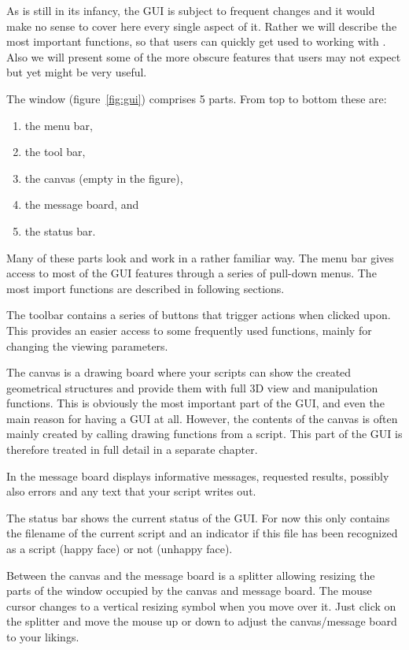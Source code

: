 As \pyf is still in its infancy, the GUI is subject to frequent changes and it would make no sense to cover here every single aspect of it. Rather we will describe the most important functions, so that users can quickly get used to working with \pyf. Also we will present some of the more obscure features that users may not expect but yet might be very useful. 

The \pyf window (figure~\ref{fig:gui}) comprises 5 parts. From top to bottom these are:
\begin{enumerate}
\item the menu bar,
\item the tool bar,
\item the canvas (empty in the figure),
\item the message board, and
\item the status bar.
\end{enumerate}

Many of these parts look and work in a rather familiar way. The menu bar gives access to most of the \pyf GUI features through a series of pull-down menus.
The most import functions are described in following sections.

The toolbar contains a series of buttons that trigger actions when clicked upon. This provides an easier access to some frequently used functions, mainly for changing the viewing parameters.

The canvas is a drawing board where your \pyf scripts can show the created geometrical structures and provide them with full 3D view and manipulation functions. This is obviously the most important part of the GUI, and even the main reason for having a GUI at all. However, the contents of the canvas is often mainly created by calling drawing functions from a script. This part of the GUI is therefore treated in full detail in a separate chapter. 

In the message board \pyf displays informative messages, requested results, possibly also errors and any text that your \pyf script writes out.

The status bar shows the current status of the GUI. For now this only contains the filename of the current script and an indicator if this file has been recognized as a \pyf script (happy face) or not (unhappy face).


Between the canvas and the message board is a splitter allowing resizing the parts of the window occupied by the canvas and message board. The mouse cursor changes to a vertical resizing symbol when you move over it. Just click on the splitter and move the mouse up or down to adjust the canvas/message board to your likings. 

